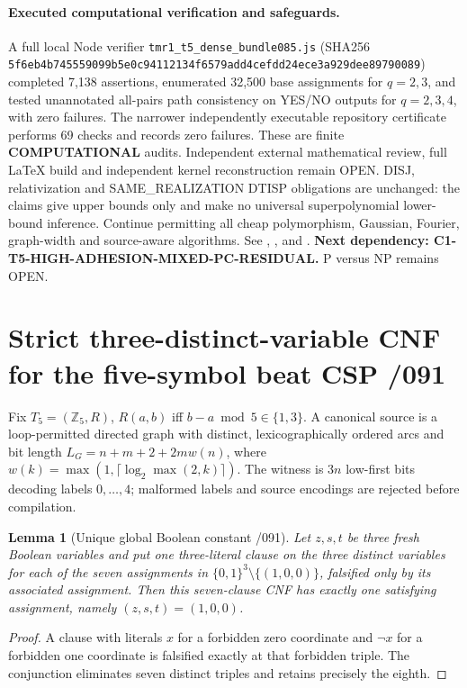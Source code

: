 \documentclass[11pt]{article}
\newtheorem{lemma}{Lemma}
\begin{document}
\paragraph{Executed computational verification and safeguards.}
A full local Node verifier
\texttt{tmr1\_t5\_dense\_bundle085.js} (SHA256
\texttt{5f6eb4b745559099b5e0c94112134f6579add4cefdd24ece3a929dee89790089})
completed 7,138 assertions, enumerated 32,500 base
assignments for $q=2,3$, and tested unannotated all-pairs
path consistency on YES/NO outputs for $q=2,3,4$,
with zero failures. The narrower independently executable
repository certificate performs 69 checks and records
zero failures. These are finite \textbf{COMPUTATIONAL} audits.
Independent external mathematical review, full LaTeX build
and independent kernel reconstruction remain OPEN.
DISJ, relativization and SAME\_REALIZATION DTISP obligations
are unchanged: the claims give upper bounds only and make
no universal superpolynomial lower-bound inference.
Continue permitting all cheap polymorphism, Gaussian,
Fourier, graph-width and source-aware algorithms.
See ,
, and
.
\textbf{Next dependency:
C1-T5-HIGH-ADHESION-MIXED-PC-RESIDUAL.}
P versus NP remains OPEN.


\section{Strict three-distinct-variable CNF for the five-symbol beat CSP /091}
Fix $T_5=(\mathbb Z_5,R)$, $R(a,b)$ iff
$b-a\bmod5\in\{1,3\}$.  A canonical source is a loop-permitted
directed graph with distinct, lexicographically ordered arcs and
bit length $L_G=n+m+2+2m w(n)$, where
$w(k)=\max(1,\lceil\log_2\max(2,k)\rceil)$.
The witness is $3n$ low-first bits decoding labels $0,\ldots,4$;
malformed labels and source encodings are rejected before compilation.

\begin{lemma}[Unique global Boolean constant /091]
Let $z,s,t$ be three fresh Boolean variables and put one
three-literal clause on the three distinct variables for each of the
seven assignments in $\{0,1\}^3\setminus\{(1,0,0)\}$, falsified only
by its associated assignment. Then this seven-clause CNF has
exactly one satisfying assignment, namely $(z,s,t)=(1,0,0)$.
\end{lemma}
\begin{proof}
A clause with literals $x$ for a forbidden zero coordinate and
$\neg x$ for a forbidden one coordinate is falsified exactly
at that forbidden triple. The conjunction eliminates seven distinct
triples and retains precisely the eighth.
\end{proof}
\end{document}
